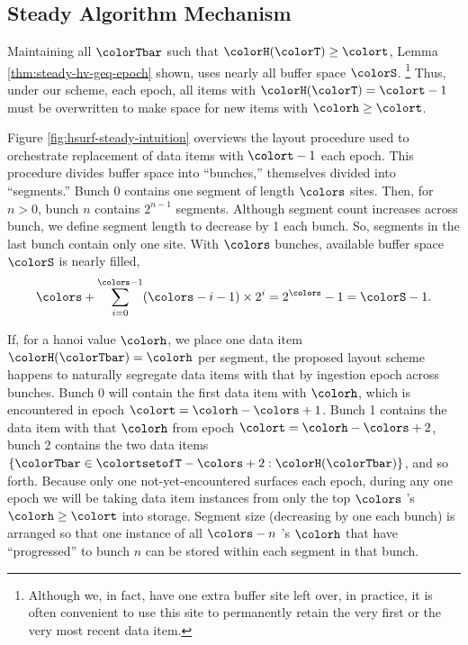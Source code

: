 

\subsection{Steady Algorithm Mechanism}
\label{sec:steady-mechanism}



Maintaining all $\colorTbar$ such that $\colorH(\colorT) \geq \colort$, Lemma \ref{thm:steady-hv-geq-epoch} shown, uses nearly all buffer space $\colorS$.%
\footnote{%
Although we, in fact, have one extra buffer site left over, in practice, it is often convenient to use this site to permanently retain the very first or the very most recent data item.%
}
Thus, under our scheme, each epoch, all items with $\colorH(\colorT) = \colort - 1$ must be overwritten to make space for new items with \hv{} $\colorh \geq \colort$.

Figure \ref{fig:hsurf-steady-intuition} overviews the layout procedure used to orchestrate replacement of data items with \hv{} $\colort - 1$ each epoch.
This procedure divides buffer space into ``bunches,'' themselves divided into ``segments.''
Bunch 0 contains one segment of length $\colors$ sites.
Then, for $n > 0$, bunch $n$ contains $2^{n-1}$ segments.
Although segment count increases across bunch, we define segment length to decrease by 1 each bunch.
So, segments in the last bunch contain only one site.
With $\colors$ bunches, available buffer space $\colorS$ is nearly filled,
\begin{align*}
\colors + \sum_{i=0}^{\colors-1} (\colors - i - 1) \times 2^{i} = 2^{\colors} - 1 = \colorS - 1.
\end{align*}

If, for a hanoi value $\colorh$, we place one data item $\colorH(\colorTbar) = \colorh$ per segment, the proposed layout scheme happens to naturally segregate data items with that \hv{} by ingestion epoch across bunches.
Bunch 0 will contain the first data item with \hv{} $\colorh$, which is encountered in epoch $\colort=\colorh - \colors + 1$.
Bunch 1 contains the data item with that \hv{} $\colorh$ from epoch $\colort=\colorh - \colors + 2$, bunch 2 contains the two data items $\{ \colorTbar \in \colortsetofT - \colors + 2 : \colorH(\colorTbar) \}$, and so forth.
Because only one not-yet-encountered \hv{} surfaces each epoch, during any one epoch we will be taking data item instances from only the top $\colors$ \hv{}'s $\colorh \geq \colort$ into storage.
Segment size (decreasing by one each bunch) is arranged so that one instance of all $\colors - n$ \hv{}'s $\colorh$ that have ``progressed'' to bunch $n$ can be stored within each segment in that bunch.

